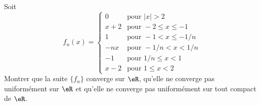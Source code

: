 \begin{exercice}\label{exo114}
Soit
\begin{equation}
f_n(x)=
	\begin{cases}
	0	&	\text{pour }| x |>2\\
	x+2	&	\text{pour }-2\leq x\leq -1\\
	1	&	\text{pour }-1<x\leq -1/n\\
	-nx	&	\text{pour }-1/n<x<1/n\\
	-1	&	\text{pour }1/n\leq x<1\\
	x-2	&	 \text{pour }1\leq x<2
\end{cases}
\end{equation}
Montrer que la suite $\{ f_n \}$ converge sur $\eR$, qu'elle ne converge pas uniformément sur $\eR$ et qu'elle ne converge pas uniformément sur tout compact de $\eR$.

\end{exercice}


